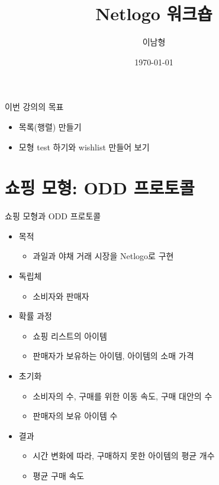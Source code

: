 \documentclass[hyperref={unicode}]{beamer}
\title{Netlogo 워크숍}
\author{이남형\inst{1}}
\institute{\inst{1} 연세대학교 경영연구소}
\date{\today}
\begin{document}
\begin{frame}[plain]
\titlepage	
\end{frame}

\begin{frame}
\tableofcontents	
\end{frame}

\begin{frame}{이번 강의의 목표}
\begin{itemize}
\item 목록(행렬) 만들기
\item 모형 test 하기와 wishlist 만들어 보기
\end{itemize}	
\end{frame}


\section{쇼핑 모형: ODD 프로토콜}
\begin{frame}{쇼핑 모형과 ODD 프로토콜}
\begin{itemize}
\item 목적
	\begin{itemize}
	\item 과일과 야채 거래 시장을 Netlogo로 구현
	\end{itemize}
\item 독립체
	\begin{itemize}
	\item 소비자와 판매자
	\end{itemize}
\item 확률 과정
	\begin{itemize}
	\item 쇼핑 리스트의 아이템 
	\item 판매자가 보유하는 아이템, 아이템의 소매 가격
	\end{itemize}
\item 초기화
	\begin{itemize}
	\item 소비자의 수, 구매를 위한 이동 속도, 구매 대안의 수
	\item 판매자의 보유 아이템 수
	\end{itemize}
\item 결과
	\begin{itemize}
	\item 시간 변화에 따라, 구매하지 못한 아이템의 평균 개수
	\item 평균 구매 속도
	\end{itemize} 
\end{itemize}	
\end{frame}
\end{document}
